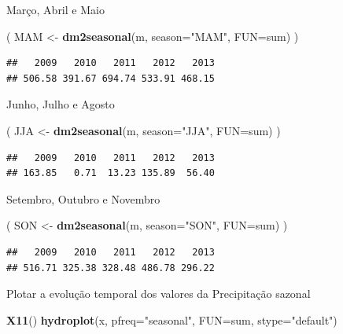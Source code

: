 \documentclass[
]{book}
\newenvironment{Shaded}{\begin{snugshade}}{\end{snugshade}}
\newcommand{\DataTypeTok}[1]{\textcolor[rgb]{0.13,0.29,0.53}{#1}}
\newcommand{\KeywordTok}[1]{\textcolor[rgb]{0.13,0.29,0.53}{\textbf{#1}}}
\newcommand{\NormalTok}[1]{#1}
\newcommand{\StringTok}[1]{\textcolor[rgb]{0.31,0.60,0.02}{#1}}
\begin{document}
Março, Abril e Maio

\begin{Shaded}
\begin{Highlighting}[]
\NormalTok{( MAM <-}\StringTok{ }\KeywordTok{dm2seasonal}\NormalTok{(m, }\DataTypeTok{season=}\StringTok{"MAM"}\NormalTok{, }\DataTypeTok{FUN=}\NormalTok{sum) )}
\end{Highlighting}
\end{Shaded}

\begin{verbatim}
##   2009   2010   2011   2012   2013 
## 506.58 391.67 694.74 533.91 468.15
\end{verbatim}

Junho, Julho e Agosto

\begin{Shaded}
\begin{Highlighting}[]
\NormalTok{( JJA <-}\StringTok{ }\KeywordTok{dm2seasonal}\NormalTok{(m, }\DataTypeTok{season=}\StringTok{"JJA"}\NormalTok{, }\DataTypeTok{FUN=}\NormalTok{sum) )}
\end{Highlighting}
\end{Shaded}

\begin{verbatim}
##   2009   2010   2011   2012   2013 
## 163.85   0.71  13.23 135.89  56.40
\end{verbatim}

Setembro, Outubro e Novembro

\begin{Shaded}
\begin{Highlighting}[]
\NormalTok{( SON <-}\StringTok{ }\KeywordTok{dm2seasonal}\NormalTok{(m, }\DataTypeTok{season=}\StringTok{"SON"}\NormalTok{, }\DataTypeTok{FUN=}\NormalTok{sum) )}
\end{Highlighting}
\end{Shaded}

\begin{verbatim}
##   2009   2010   2011   2012   2013 
## 516.71 325.38 328.48 486.78 296.22
\end{verbatim}

Plotar a evolução temporal dos valores da Precipitação sazonal

\begin{Shaded}
\begin{Highlighting}[]
\KeywordTok{X11}\NormalTok{()}
\KeywordTok{hydroplot}\NormalTok{(x, }\DataTypeTok{pfreq=}\StringTok{"seasonal"}\NormalTok{, }\DataTypeTok{FUN=}\NormalTok{sum, }\DataTypeTok{stype=}\StringTok{"default"}\NormalTok{)}
\end{Highlighting}
\end{Shaded}
\end{document}
